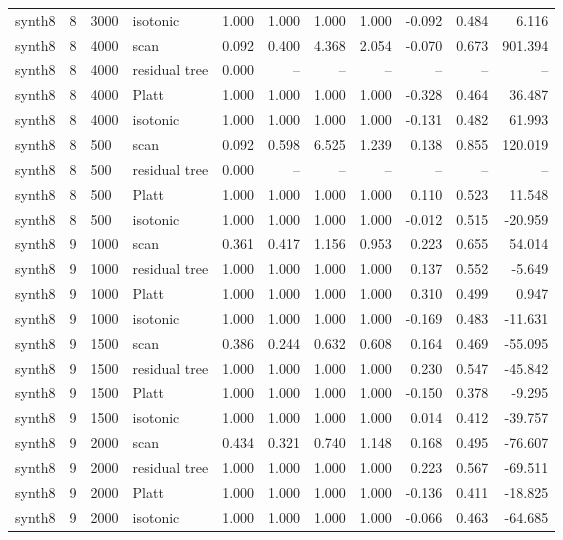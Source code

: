 \begin{tabular}{lrllrrrrrrr}
synth8 & 8 & 3000 & isotonic & 1.000 & 1.000 & 1.000 & 1.000 & -0.092 & 0.484 & 6.116 \\
synth8 & 8 & 4000 & scan & 0.092 & 0.400 & 4.368 & 2.054 & -0.070 & 0.673 & 901.394 \\
synth8 & 8 & 4000 & residual tree & 0.000 & -- & -- & -- & -- & -- & -- \\
synth8 & 8 & 4000 & Platt & 1.000 & 1.000 & 1.000 & 1.000 & -0.328 & 0.464 & 36.487 \\
synth8 & 8 & 4000 & isotonic & 1.000 & 1.000 & 1.000 & 1.000 & -0.131 & 0.482 & 61.993 \\
synth8 & 8 & 500 & scan & 0.092 & 0.598 & 6.525 & 1.239 & 0.138 & 0.855 & 120.019 \\
synth8 & 8 & 500 & residual tree & 0.000 & -- & -- & -- & -- & -- & -- \\
synth8 & 8 & 500 & Platt & 1.000 & 1.000 & 1.000 & 1.000 & 0.110 & 0.523 & 11.548 \\
synth8 & 8 & 500 & isotonic & 1.000 & 1.000 & 1.000 & 1.000 & -0.012 & 0.515 & -20.959 \\
synth8 & 9 & 1000 & scan & 0.361 & 0.417 & 1.156 & 0.953 & 0.223 & 0.655 & 54.014 \\
synth8 & 9 & 1000 & residual tree & 1.000 & 1.000 & 1.000 & 1.000 & 0.137 & 0.552 & -5.649 \\
synth8 & 9 & 1000 & Platt & 1.000 & 1.000 & 1.000 & 1.000 & 0.310 & 0.499 & 0.947 \\
synth8 & 9 & 1000 & isotonic & 1.000 & 1.000 & 1.000 & 1.000 & -0.169 & 0.483 & -11.631 \\
synth8 & 9 & 1500 & scan & 0.386 & 0.244 & 0.632 & 0.608 & 0.164 & 0.469 & -55.095 \\
synth8 & 9 & 1500 & residual tree & 1.000 & 1.000 & 1.000 & 1.000 & 0.230 & 0.547 & -45.842 \\
synth8 & 9 & 1500 & Platt & 1.000 & 1.000 & 1.000 & 1.000 & -0.150 & 0.378 & -9.295 \\
synth8 & 9 & 1500 & isotonic & 1.000 & 1.000 & 1.000 & 1.000 & 0.014 & 0.412 & -39.757 \\
synth8 & 9 & 2000 & scan & 0.434 & 0.321 & 0.740 & 1.148 & 0.168 & 0.495 & -76.607 \\
synth8 & 9 & 2000 & residual tree & 1.000 & 1.000 & 1.000 & 1.000 & 0.223 & 0.567 & -69.511 \\
synth8 & 9 & 2000 & Platt & 1.000 & 1.000 & 1.000 & 1.000 & -0.136 & 0.411 & -18.825 \\
synth8 & 9 & 2000 & isotonic & 1.000 & 1.000 & 1.000 & 1.000 & -0.066 & 0.463 & -64.685 \\

\end{tabular}
